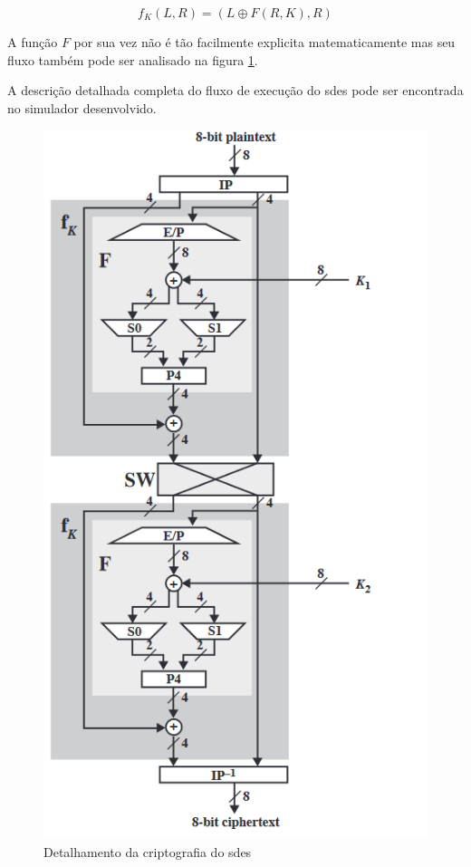 \[f_K(L, R) = (L \oplus F(R, K), R)\]

A função \(F\) por sua vez não é tão facilmente explicita matematicamente mas seu fluxo também pode ser analisado na figura \ref{fig:sdesdetail}. \cite{stallings10}

A descrição detalhada completa do fluxo de execução do \acrshort{sdes} pode ser encontrada no simulador desenvolvido.

\begin{figure}[H]
    \centering
    \caption{Detalhamento da criptografia do \acrshort{sdes}}
    \label{fig:sdesdetail}
    \includegraphics[width=.5\linewidth]{Figuras/SDESEncrypDetail.png}
\end{figure}

